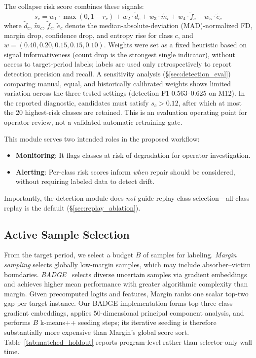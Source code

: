 \documentclass[preprint,12pt,authoryear]{elsarticle}
\let\cite\citep
\begin{document}
The collapse risk score combines these signals:
\begin{equation}
  s_c = w_1 \cdot \max(0, 1{-}r_c) + w_2 \cdot \tilde{d}_c + w_3 \cdot \tilde{m}_c + w_4 \cdot \tilde{f}_c + w_5 \cdot \tilde{e}_c
\end{equation}
where $\tilde{d}_c$, $\tilde{m}_c$, $\tilde{f}_c$, $\tilde{e}_c$ denote the median-absolute-deviation (MAD)-normalized FD, margin drop, confidence drop, and entropy rise for class $c$, and $w = (0.40, 0.20, 0.15, 0.15, 0.10)$.
Weights were set as a fixed heuristic based on signal informativeness (count drop is the strongest single indicator), without access to target-period labels; labels are used only retrospectively to report detection precision and recall.
A sensitivity analysis (\S\ref{sec:detection_eval}) comparing manual, equal, and historically calibrated weights shows limited variation across the three tested settings (detection F1 0.563--0.625 on M12).
In the reported diagnostic, candidates must satisfy $s_c>0.12$, after which at most the 20 highest-risk classes are retained.
This is an evaluation operating point for operator review, not a validated automatic retraining gate.

This module serves two intended roles in the proposed workflow:
\begin{itemize}
  \item \textbf{Monitoring}: It flags classes at risk of degradation for operator investigation.
  \item \textbf{Alerting}: Per-class risk scores inform \textit{when} repair should be considered, without requiring labeled data to detect drift.
\end{itemize}
Importantly, the detection module does \textit{not} guide replay class selection---all-class replay is the default (\S\ref{sec:replay_ablation}).

\subsection{Active Sample Selection}
\label{sec:sample_select}

From the target period, we select a budget $B$ of samples for labeling.
\textit{Margin sampling} selects globally low-margin samples, which may include absorber--victim boundaries.
\textit{BADGE}~\cite{ash2020badge} selects diverse uncertain samples via gradient embeddings and achieves higher mean performance with greater algorithmic complexity than margin.
Given precomputed logits and features, Margin ranks one scalar top-two gap per target instance. Our BADGE implementation forms top-three-class gradient embeddings, applies 50-dimensional principal component analysis, and performs $B$ k-means++ seeding steps; its iterative seeding is therefore substantially more expensive than Margin's global score sort. Table~\ref{tab:matched_holdout} reports program-level rather than selector-only wall time.
\end{document}
